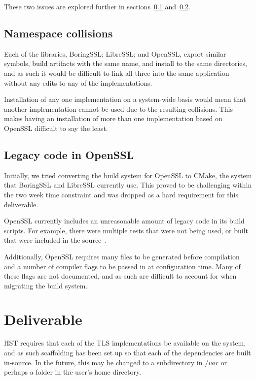 \documentclass{acm_proc_article-sp}
\begin{document}
These two issues are explored further in sections~\ref{Sec:Name}
and~\ref{Sec:Legacy}.

\subsection{Namespace collisions}\label{Sec:Name}

Each of the libraries, BoringSSL; LibreSSL; and OpenSSL, export similar symbols,
build artifacts with the same name, and install to the same directories, and as
such it would be difficult to link all three into the same application without
any edits to any of the implementations.

Installation of any one implementation on a system-wide basis would mean that
another implementation cannot be used due to the resulting collisions. This
makes having an installation of more than one implementation based on OpenSSL
difficult to say the least.

\subsection{Legacy code in OpenSSL}\label{Sec:Legacy}

Initially, we tried converting the build system for OpenSSL to CMake, the system
that BoringSSL and LibreSSL currently use. This proved to be challenging within
the two week time constraint and was dropped as a hard requirement for this
deliverable.

OpenSSL currently includes an unreasonable amount of legacy code in its build
scripts. For example, there were multiple tests that were not being used, or
built that were included in the source~\cite{issue}.

Additionally, OpenSSL requires many files to be generated before compilation and
a number of compiler flags to be passed in at configuration time. Many of these
flags are not documented, and as such are difficult to account for when
migrating the build system.

\section{Deliverable}

HST requires that each of the TLS implementations be available on the system,
and as such scaffolding has been set up so that each of the dependencies are
built in-source. In the future, this may be changed to a subdirectory in $/var$
or perhaps a folder in the user's home directory.
\end{document}

